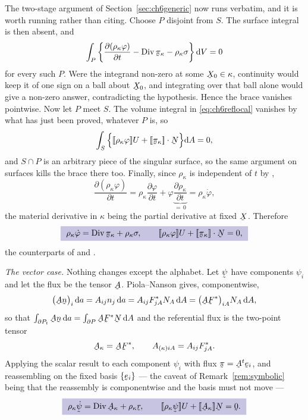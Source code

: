 \begin{solution}
The two-stage argument of Section~\ref{sec:ch6generic} now runs
verbatim, and it is worth running rather than citing. Choose $P$
disjoint from $S$. The surface integral is then absent, and
\[
   \int_{P}\left\{\frac{\partial(\rho_{\kappa}\varphi)}{\partial t}
   -\Dvg\vek\pi_{\kappa}-\rho_{\kappa}\sigma\right\}\dl V=0
\]
for every such $P$. Were the integrand non-zero at some
$\bX_{0}\in\kappa$, continuity would keep it of one sign on a ball
about $\bX_{0}$, and integrating over that ball alone would give a
non-zero answer, contradicting the hypothesis. Hence the brace vanishes
pointwise. Now let $P$ meet $S$. The volume integral in
\eqref{eq:ch6reflocal} vanishes by what has just been proved, whatever
$P$ is, so
\[
   \int_{S}\Big\{\jump{\rho_{\kappa}\varphi}U
   +\ip{\jump{\vek\pi_{\kappa}}}\bN\Big\}\dl A=0 ,
\]
and $S\cap P$ is an arbitrary piece of the singular surface, so the same
argument on surfaces kills the brace there too. Finally, since
$\rho_{\kappa}$ is independent of $t$ by ,
\[
   \frac{\partial(\rho_{\kappa}\varphi)}{\partial t}
   =\rho_{\kappa}\frac{\partial\varphi}{\partial t}
   +\varphi\underbrace{\frac{\partial\rho_{\kappa}}{\partial t}}_{=\,0}
   =\rho_{\kappa}\dot\varphi ,
\]
the material derivative in $\kappa$ being the partial derivative at
fixed $\bX$. Therefore
\[
   \boxed{\ \rho_{\kappa}\dot\varphi=\Dvg\vek\pi_{\kappa}
   +\rho_{\kappa}\sigma ,
   \qquad
   \jump{\rho_{\kappa}\varphi}U
   +\ip{\jump{\vek\pi_{\kappa}}}\bN=0 ,\ }
\]
the counterparts of  and .


\medskip
\noindent\emph{The vector case.}
Nothing changes except the alphabet. Let $\vek\psi$ have components
$\psi_{i}$ and let the flux be the tensor $\bA$. Piola--Nanson gives,
componentwise,
\[
   \big(\bA\bn\big)_{i}\,\dl a=A_{ij}n_{j}\,\dl a
   =A_{ij}F^{*}_{jA}N_{A}\,\dl A
   =\big(\bA\bF^{*}\big)_{iA}N_{A}\,\dl A ,
\]
so that $\int_{\partial P_{t}}\bA\bn\,\dl a
=\int_{\partial P}\bA\bF^{*}\bN\,\dl A$ and the referential flux is the
two-point tensor
\[
   \bA_{\kappa}=\bA\bF^{*},
   \qquad
   A_{(\kappa)iA}=A_{ij}F^{*}_{jA} .
\]
Applying the scalar result to each component $\psi_{i}$ with flux
$\vek\pi=\bA^{t}\be_{i}$, and reassembling on the fixed basis
$\{\be_{i}\}$ --- the caveat of Remark~\ref{rem:symbolic} being that the
reassembly is componentwise and the basis must not move ---
\[
   \boxed{\ \rho_{\kappa}\dot{\vek\psi}=\Dvg\bA_{\kappa}
   +\rho_{\kappa}\br ,
   \qquad
   \jump{\rho_{\kappa}\vek\psi}U+\jump{\bA_{\kappa}}\bN=\bze .\ }
\]


\end{solution}

